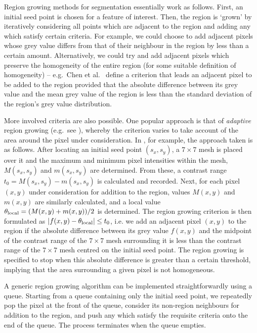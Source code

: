 Region growing methods for segmentation essentially work as follows. First, an initial seed point is chosen for a feature of interest. Then, the region is `grown' by iteratively considering all points which are adjacent to the region and adding any which satisfy certain criteria. For example, we could choose to add adjacent pixels whose grey value differs from that of their neighbour in the region by less than a certain amount. Alternatively, we could try and add adjacent pixels which preserve the homogeneity of the entire region (for some suitable definition of homogeneity) -- e.g.~Chen et al.\ \cite{chen09} define a criterion that leads an adjacent pixel to be added to the region provided that the absolute difference between its grey value and the mean grey value of the region is less than the standard deviation of the region's grey value distribution.

More involved criteria are also possible. One popular approach is that of \emph{adaptive} region growing (e.g.~see \cite{lin06,pohle01}), whereby the criterion varies to take account of the area around the pixel under consideration. In \cite{lin06}, for example, the approach taken is as follows. After locating an initial seed point $(s_x, s_y)$, a $7 \times 7$ mesh is placed over it and the maximum and minimum pixel intensities within the mesh, $M(s_x, s_y)$ and $m(s_x, s_y)$ are determined. From these, a contrast range $t_0 = M(s_x, s_y) - m(s_x, s_y)$ is calculated and recorded. Next, for each pixel $(x,y)$ under consideration for addition to the region, values $M(x,y)$ and $m(x,y)$ are similarly calculated, and a local value $\theta_{\rm local} = (M(x,y) + m(x,y)) / 2$ is determined. The region growing criterion is then formulated as $|f(x,y) - \theta_{\rm local}| \le t_0$, i.e. we add an adjacent pixel $(x,y)$ to the region if the absolute difference between its grey value $f(x,y)$ and the midpoint of the contrast range of the $7 \times 7$ mesh surrounding it is less than the contrast range of the $7 \times 7$ mesh centred on the initial seed point. The region growing is specified to stop when this absolute difference is greater than a certain threshold, implying that the area surrounding a given pixel is not homogeneous.

A generic region growing algorithm can be implemented straightforwardly using a queue. Starting from a queue containing only the initial seed point, we repeatedly pop the pixel at the front of the queue, consider its non-region neighbours for addition to the region, and push any which satisfy the requisite criteria onto the end of the queue. The process terminates when the queue empties.

